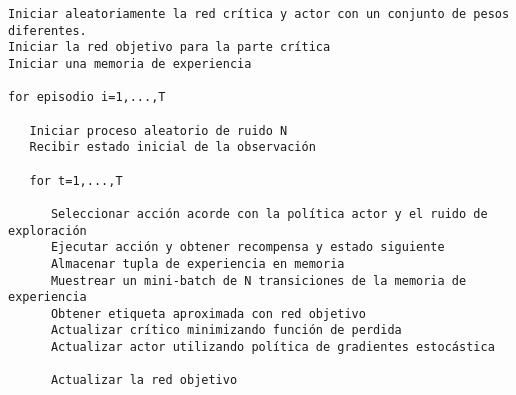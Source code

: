 \documentclass[11pt,fleqn]{book} %
\begin{document}
\begin{verbatim}
Iniciar aleatoriamente la red crítica y actor con un conjunto de pesos diferentes.
Iniciar la red objetivo para la parte crítica
Iniciar una memoria de experiencia

for episodio i=1,...,T

   Iniciar proceso aleatorio de ruido N 
   Recibir estado inicial de la observación
   
   for t=1,...,T
   
      Seleccionar acción acorde con la política actor y el ruido de exploración
      Ejecutar acción y obtener recompensa y estado siguiente
      Almacenar tupla de experiencia en memoria
      Muestrear un mini-batch de N transiciones de la memoria de experiencia
      Obtener etiqueta aproximada con red objetivo
      Actualizar crítico minimizando función de perdida
      Actualizar actor utilizando política de gradientes estocástica
      
      Actualizar la red objetivo

\end{verbatim}

\end{document}
